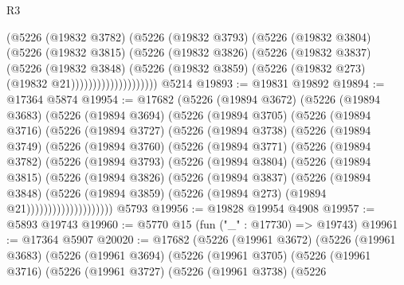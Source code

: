 \begin{lexlean}{R3}
\begin{coremodule}
                        (@5226
                          (@19832 @3782)
                          (@5226
                            (@19832 @3793)
                            (@5226
                              (@19832 @3804)
                              (@5226
                                (@19832 @3815)
                                (@5226
                                  (@19832 @3826)
                                  (@5226
                                    (@19832 @3837)
                                    (@5226
                                      (@19832 @3848)
                                      (@5226
                                        (@19832 @3859)
                                        (@5226 (@19832 @273) (@19832 @21))))))))))))))))))))
    @5214
@19893 := @19831 @19892
@19894 := @17364 @5874
@19954 := @17682
    (@5226
      (@19894 @3672)
      (@5226
        (@19894 @3683)
        (@5226
          (@19894 @3694)
          (@5226
            (@19894 @3705)
            (@5226
              (@19894 @3716)
              (@5226
                (@19894 @3727)
                (@5226
                  (@19894 @3738)
                  (@5226
                    (@19894 @3749)
                    (@5226
                      (@19894 @3760)
                      (@5226
                        (@19894 @3771)
                        (@5226
                          (@19894 @3782)
                          (@5226
                            (@19894 @3793)
                            (@5226
                              (@19894 @3804)
                              (@5226
                                (@19894 @3815)
                                (@5226
                                  (@19894 @3826)
                                  (@5226
                                    (@19894 @3837)
                                    (@5226
                                      (@19894 @3848)
                                      (@5226
                                        (@19894 @3859)
                                        (@5226 (@19894 @273) (@19894 @21))))))))))))))))))))
    @5793
@19956 := @19828 @19954 @4908
@19957 := @5893 @19743
@19960 := @5770 @15 (fun ("_" : @17730) => @19743)
@19961 := @17364 @5907
@20020 := @17682
    (@5226
      (@19961 @3672)
      (@5226
        (@19961 @3683)
        (@5226
          (@19961 @3694)
          (@5226
            (@19961 @3705)
            (@5226
              (@19961 @3716)
              (@5226
                (@19961 @3727)
                (@5226
                  (@19961 @3738)
                  (@5226

\end{coremodule}
\end{lexlean}
